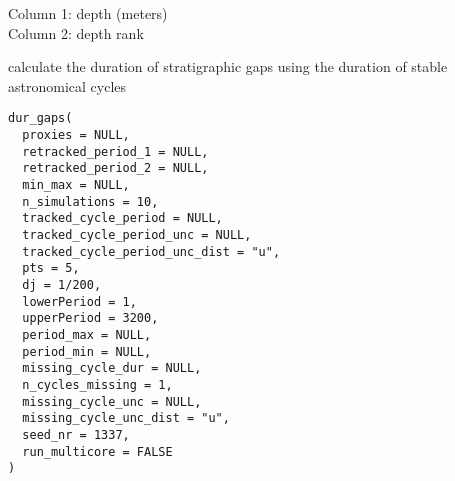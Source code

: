 \documentclass[a4paper]{book}
\begin{document}
%
\begin{Details}
Column 1: depth (meters)\\{}
Column 2: depth rank \\{}
\end{Details}
%
\begin{Description}
calculate the duration of stratigraphic gaps using the duration
of stable astronomical cycles
\end{Description}
%
\begin{Usage}
\begin{verbatim}
dur_gaps(
  proxies = NULL,
  retracked_period_1 = NULL,
  retracked_period_2 = NULL,
  min_max = NULL,
  n_simulations = 10,
  tracked_cycle_period = NULL,
  tracked_cycle_period_unc = NULL,
  tracked_cycle_period_unc_dist = "u",
  pts = 5,
  dj = 1/200,
  lowerPeriod = 1,
  upperPeriod = 3200,
  period_max = NULL,
  period_min = NULL,
  missing_cycle_dur = NULL,
  n_cycles_missing = 1,
  missing_cycle_unc = NULL,
  missing_cycle_unc_dist = "u",
  seed_nr = 1337,
  run_multicore = FALSE
)
\end{verbatim}
\end{Usage}
%
\end{document}

